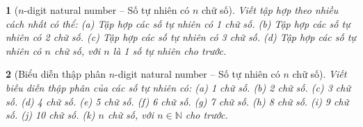 \documentclass{article}
\newtheorem{baitoan}{}
\begin{document}
\begin{baitoan}[$n$-digit natural number -- Số tự nhiên có $n$ chữ số]
	Viết tập hợp theo nhiều cách nhất có thể: (a) Tập hợp các số tự nhiên có 1 chữ số. (b) Tập hợp các số tự nhiên có 2 chữ số. (c) Tập hợp các số tự nhiên có 3 chữ số. (d) Tập hợp các số tự nhiên có $n$ chữ số, với $n$ là 1 số tự nhiên cho trước.
\end{baitoan}

\begin{baitoan}[Biểu diễn thập phân $n$-digit natural number -- Số tự nhiên có $n$ chữ số]
	Viết biễu diễn thập phân của các số tự nhiên có: (a) 1 chữ số. (b) 2 chữ số. (c) 3 chữ số. (d) 4 chữ số. (e) 5 chữ số. (f) 6 chữ số. (g) 7 chữ số. (h) 8 chữ số. (i) 9 chữ số. (j) 10 chữ số. (k) $n$ chữ số, với $n\in\mathbb{N}$ cho trước.
\end{baitoan}
\end{document}
